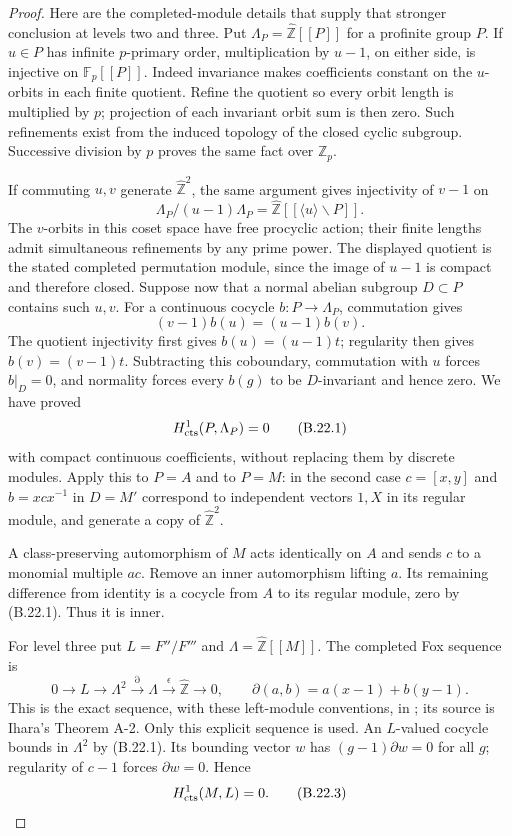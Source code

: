 \begin{proof}
Here are the completed-module details that supply that stronger
conclusion at levels two and three. Put
$\Lambda_P=\widehat{\mathbb Z}[[P]]$ for a profinite group $P$.
If $u\in P$ has infinite $p$-primary order, multiplication by
$u-1$, on either side, is injective on $\mathbb F_p[[P]]$.
Indeed invariance makes coefficients constant on the $u$-orbits
in each finite quotient. Refine the quotient so every orbit
length is multiplied by $p$; projection of each invariant orbit
sum is then zero. Such refinements exist from the induced
topology of the closed cyclic subgroup. Successive division by
$p$ proves the same fact over $\mathbb Z_p$.

If commuting $u,v$ generate $\widehat{\mathbb Z}^2$, the same
argument gives injectivity of $v-1$ on
\[
 \Lambda_P/(u-1)\Lambda_P
  =\widehat{\mathbb Z}[[\langle u\rangle\backslash P]].
\]
The $v$-orbits in this coset space have free procyclic action;
their finite lengths admit simultaneous refinements by any
prime power. The displayed quotient is the stated completed
permutation module, since the image of $u-1$ is compact and
therefore closed. Suppose now that a normal abelian subgroup
$D\subset P$ contains such $u,v$. For a continuous cocycle
$b:P\to\Lambda_P$, commutation gives
\[
 (v-1)b(u)=(u-1)b(v).
\]
The quotient injectivity first gives $b(u)=(u-1)t$; regularity
then gives $b(v)=(v-1)t$. Subtracting this coboundary, commutation
with $u$ forces $b|_D=0$, and normality forces every $b(g)$ to
be $D$-invariant and hence zero. We have proved
\[
 H^1_{\rm cts}(P,\Lambda_P)=0
 \tag{B.22.1}
\]
with compact continuous coefficients, without replacing them
by discrete modules. Apply this to $P=A$ and to $P=M$:
in the second case $c=[x,y]$ and $b=xcx^{-1}$ in $D=M'$
correspond to independent vectors $1,X$ in its regular module,
and generate a copy of $\widehat{\mathbb Z}^2$.

A class-preserving automorphism of $M$ acts identically on $A$
and sends $c$ to a monomial multiple $a c$. Remove an inner
automorphism lifting $a$. Its remaining difference from identity
is a cocycle from $A$ to its regular module, zero by (B.22.1).
Thus it is inner.

For level three put $L=F''/F'''$ and
$\Lambda=\widehat{\mathbb Z}[[M]]$. The completed Fox sequence is
\[
 0\longrightarrow L\longrightarrow\Lambda^2
 \xrightarrow{\partial}\Lambda
 \xrightarrow{\epsilon}\widehat{\mathbb Z}\longrightarrow0,
 \qquad\partial(a,b)=a(x-1)+b(y-1).
 \tag{B.22.2}
\]
This is the exact sequence, with these left-module conventions,
in \cite[Proposition 1.1]{PBC_YamaguchiCenters2026}; its source
is Ihara's Theorem A-2. Only this explicit sequence is used.
An $L$-valued cocycle bounds in $\Lambda^2$ by (B.22.1).
Its bounding vector $w$ has $(g-1)\partial w=0$ for all $g$;
regularity of $c-1$ forces $\partial w=0$. Hence
\[
                         H^1_{\rm cts}(M,L)=0.
 \tag{B.22.3}
\]


\end{proof}
